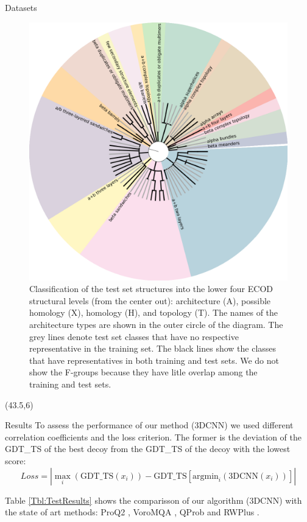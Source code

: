 \documentclass[final, unknownkeysallowed]{beamer}
\begin{document}
\begin{frame}{}
\begin{textblock}{39.0}
\begin{block}{Datasets}
\begin{figure}[H]
    \centering
    \includegraphics[width=0.50\linewidth]{../draft/Fig/folds_graph.png}
%
    \caption{Classification of the test set structures into the lower
    four ECOD structural levels (from the center out): architecture
    (A), possible homology (X), homology (H), and topology (T). The
    names of the architecture types are shown in the outer circle of
    the diagram.
    The grey lines denote test set classes that have no
    respective representative in the training set. The black lines
    show the classes that have representatives in both training and
    test sets. We do not show the F-groups because they have litle
    overlap among the training and test sets.
}
%
    \label{Fig:foldsGraph}
\end{figure}
\end{block}

\end{textblock}


\begin{textblock}{39.0}(43.5,6)

\begin{block}{Results}
To assess the performance of our method (3DCNN) we used different correlation coefficients and the loss criterion.
The former is the deviation of the GDT\_TS of the best decoy from the GDT\_TS of the decoy with the lowest score:
$$ 
Loss = \left| \max_i \left( \textrm{GDT\_TS}(x_i) \right) - \textrm{GDT\_TS} \left[ \textrm{argmin}_i \left( \textrm{3DCNN}(x_i) \right) \right] \right|
$$ 

Table \ref{Tbl:TestResults} shows the comparisson of our algorithm (3DCNN) with the state of art methods: 
ProQ2 \cite{ray2012proq2}, VoroMQA \cite{olechnovivc2017voromqa}, QProb \cite{cao2016protein} and RWPlus \cite{zhang2010novel}.


\end{block}
\end{textblock}
\end{frame}
\end{document}
